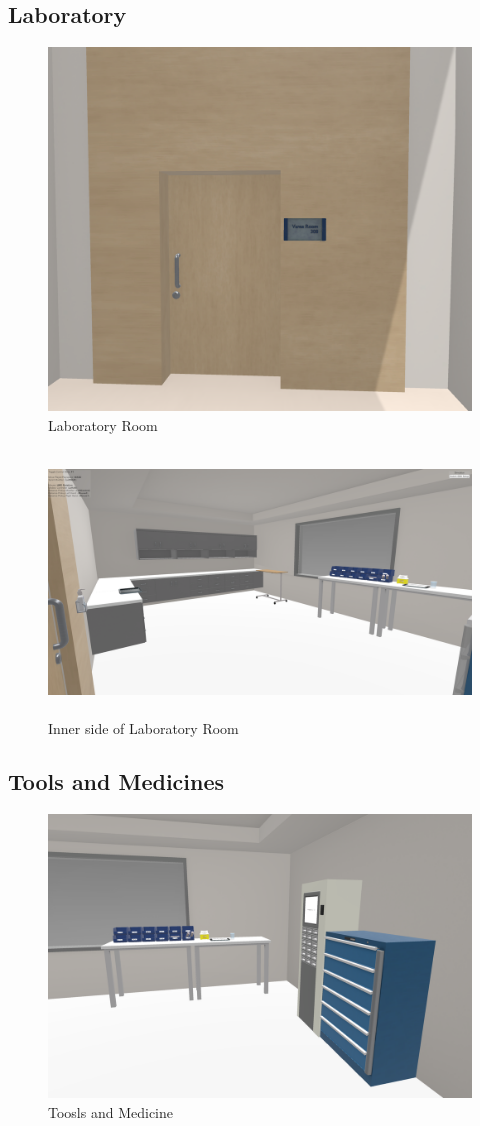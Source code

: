 \subsection{Laboratory}
\begin{figure}[h]
	\centering
	\includegraphics[width=0.65\linewidth]{Images/vanas room.png}
	\caption{Laboratory Room}
	\label{fig:system-diagram}
\end{figure}
\begin{figure}[h]
	\centering
	\includegraphics[width=0.7\linewidth, height=7cm]{Images/vanasroomindoor1 .png}
	\caption{Inner side of Laboratory Room}
	\label{fig:system-diagram}
\end{figure}
\newpage
\subsection{Tools and Medicines}
\begin{figure}[h]
	\centering
	\includegraphics[width=0.65\linewidth]{Images/vanas room indoor .png}
	\caption{Toosls and Medicine}
	\label{fig:system-diagram}
\end{figure}

